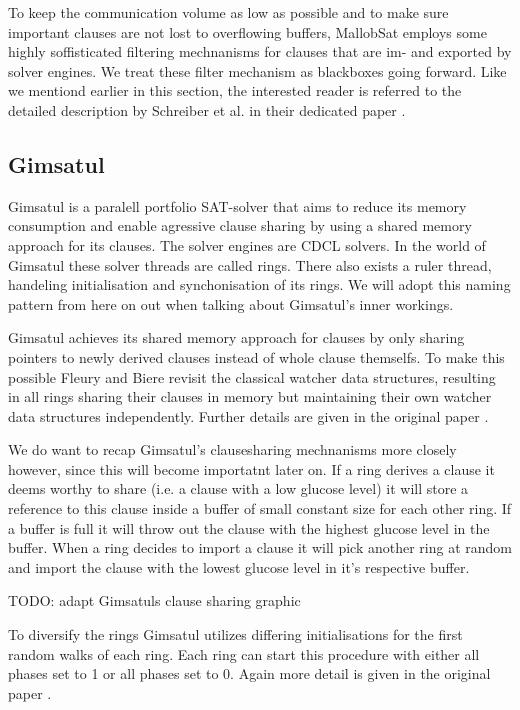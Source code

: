\documentclass[12pt,a4paper,twoside]{scrartcl}
\numberwithin{equation}{section}
\begin{document}
To keep the communication volume as low as possible and to make sure important clauses are not lost to overflowing buffers, MallobSat employs some highly soffisticated filtering mechnanisms for clauses that are im- and exported by solver engines. We treat these filter mechanism as blackboxes going forward. Like we mentiond earlier in this section, the interested reader is referred to the detailed description by Schreiber et al. in their dedicated paper \cite{mallobSat}.

\subsection{Gimsatul}

Gimsatul \cite{gimsatul} is a paralell portfolio SAT-solver that aims to reduce its memory consumption and enable agressive clause sharing by using a shared memory approach for its clauses. The solver engines are CDCL solvers. In the world of Gimsatul these solver threads are called rings. There also exists a ruler thread, handeling initialisation and synchonisation of its rings. We will adopt this naming pattern from here on out when talking about Gimsatul's inner workings.

Gimsatul achieves its shared memory approach for clauses by only sharing pointers to newly derived clauses instead of whole clause themselfs. To make this possible Fleury and Biere revisit the classical watcher data structures, resulting in all rings sharing their clauses in memory but maintaining their own watcher data structures independently. Further details are given in the original paper \cite{gimsatul}.

We do want to recap Gimsatul's clausesharing mechnanisms more closely however, since this will become importatnt later on. If a ring derives a clause it deems worthy to share (i.e. a clause with a low glucose level) it will store a reference to this clause inside a buffer of small constant size for each other ring. If a buffer is full it will throw out the clause with the highest glucose level in the buffer. When a ring decides to import a clause it will pick another ring at random and import the clause with the lowest glucose level in it's respective buffer.

TODO: adapt Gimsatuls clause sharing graphic

To diversify the rings Gimsatul utilizes differing initialisations for the first random walks of each ring. Each ring can start this procedure with either all phases set to 1 or all phases set to 0. Again more detail is given in the original paper \cite{gimsatul}.
\end{document}
